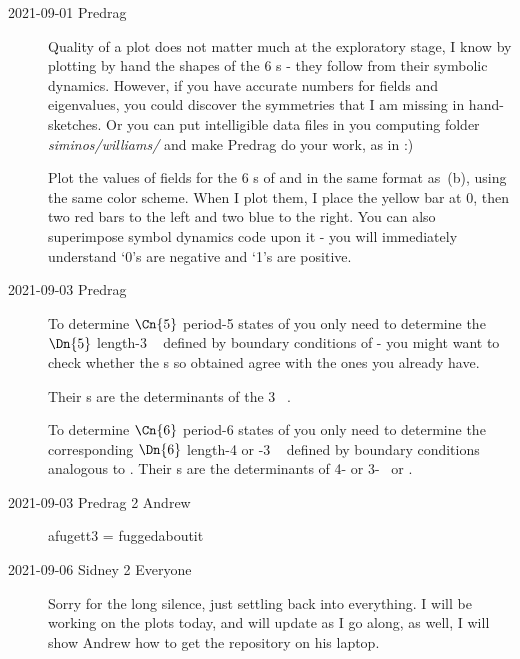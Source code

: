 \begin{description}
\item[2021-09-01 Predrag]
Quality of a plot does not matter much at the exploratory stage, I know
by plotting by hand the shapes of the 6 {\lattstate}s - they follow from
their symbolic dynamics. However, if you have accurate numbers for fields
and eigenvalues, you could discover the symmetries that I am missing in
hand-sketches. Or you can put intelligible data files in you computing folder
\emph{siminos/williams/ }and make Predrag do your work, as in
 :)

Plot the values of {\lattstate} fields for the 6 {\lattstate}s of
 and  in the same format as
\,(b), using the same color scheme. When I
plot them, I place the yellow bar at 0, then two red bars to the left and
two blue to the right. You can also superimpose symbol dynamics code upon
it - you will immediately understand `0's are negative and `1's are
positive.

\item[2021-09-03 Predrag]
To determine $\Cn{5}$ period-5 states of  you only
need to determine the  $\Dn{5}$ length-3 \brick\ {\lattstate} defined by
boundary conditions of  - you might want to check
whether the {\lattstate}s so obtained agree with the ones you already
have.

Their {\HillDet}s are the determinants of the 3\dmn\ {\jacobianOrb}
.

To determine $\Cn{6}$ period-6 states of  you only
need to determine the corresponding $\Dn{6}$ length-4 or -3 \brick\
{\lattstate} defined by boundary conditions analogous to
. Their {\HillDet}s are the determinants of 4- or
3-\dmn\ {\jacobianOrb} \refeq{jMorb1dFTEvens0} or
.


\item[2021-09-03 Predrag 2 Andrew]

afugett3 = fuggedaboutit

\item[2021-09-06 Sidney 2 Everyone]
Sorry for the long silence, just settling back into everything. I will be
working on the plots today, and will update as I go along, as well, I
will show Andrew how to get the repository on his laptop.


\end{description}
